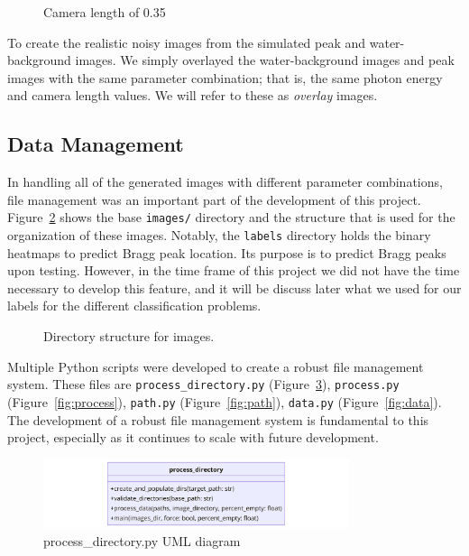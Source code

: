 \documentclass[12pt]{article}
\begin{document}
\begin{figure}[H]
\begin{minipage}{0.49\textwidth}
        \caption{Camera length of 0.35}
        \label{fig:water7}
    \end{minipage}
\end{figure}

To create the realistic noisy images from the simulated peak and water-background images. We simply overlayed the water-background images and peak images with the same parameter combination; that is, the same photon energy and camera length values. We will refer to these as \textit{overlay} images.

\subsection{Data Management}

In handling all of the generated images with different parameter combinations, file management was an important part of the development of this project. Figure~\ref{fig:dirtree} shows the base \texttt{images/} directory and the structure that is used for the organization of these images. Notably, the \texttt{labels} directory holds the binary heatmaps to predict Bragg peak location. Its purpose is to predict Bragg peaks upon testing. However, in the time frame of this project we did not have the time necessary to develop this feature, and it will be discuss later what we used for our labels for the different classification problems.\\

\begin{figure}[H]
\caption{Directory structure for images.} %
\label{fig:dirtree} %
\end{figure}

Multiple Python scripts were developed to create a robust file management system. These files are \texttt{process\_directory.py} (Figure~\ref{fig:process_directory}), \texttt{process.py} (Figure~\ref{fig:process}), \texttt{path.py} (Figure~\ref{fig:path}), \texttt{data.py} (Figure~\ref{fig:data}). The development of a robust file management system is fundamental to this project, especially as it continues to scale with future development.\\

\begin{figure}[H]
    \centering
    \includegraphics[width=0.8\textwidth]{uml_diagrams/process_directory_uml.png}
    \caption{process\_directory.py UML diagram}
    \label{fig:process_directory}
\end{figure}
\end{document}
